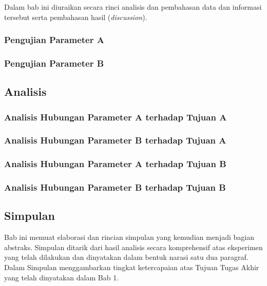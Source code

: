 \documentclass{thesis}
\begin{document}
Dalam bab ini diuraikan secara rinci analisis dan pembahasan data dan informasi tersebut serta pembahasan hasil (\textit{discussion}).

\subsubsection{Pengujian Parameter A}

\subsubsection{Pengujian Parameter B}

\subsection{Analisis}

\subsubsection{Analisis Hubungan Parameter A terhadap Tujuan A}

\subsubsection{Analisis Hubungan Parameter B terhadap Tujuan A}

\subsubsection{Analisis Hubungan Parameter A terhadap Tujuan B}

\subsubsection{Analisis Hubungan Parameter B terhadap Tujuan B}


\subsection{Simpulan}

Bab ini memuat elaborasi dan rincian simpulan yang kemudian menjadi bagian abstraks. Simpulan ditarik dari hasil analisis secara komprehensif atas eksperimen yang telah dilakukan dan dinyatakan dalam bentuk narasi satu dua paragraf. Dalam Simpulan menggambarkan tingkat ketercapaian atas Tujuan Tugas Akhir yang telah dinyatakan dalam Bab 1.
\end{document}
